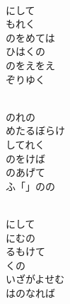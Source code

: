 \documentclass[10pt,b5j]{tarticle} %
\begin{document}
\begin{enumerate}
\begin{minipage}[c]{\blocksize}
        \vspace{\linespace}
        \item~\\
        にして\\
        もれく\\
        のをめては\\
        ひはくの\\
        のをえをえ\\
        ぞりゆく
        
        \vspace{\linespace}
        \item~\\
        のれの\\
        めたるぼらけ\\
        してれく\\
        のをけば\\
        のあげて\\
        ふ「」のの
        
        \vspace{\linespace}
        \item~\\
        にして\\
        にむの\\
        るもけて\\
        くの\\
        いざがよせむ\\
        はのなれば
    
    \end{minipage}
\end{enumerate} %
\end{document}
